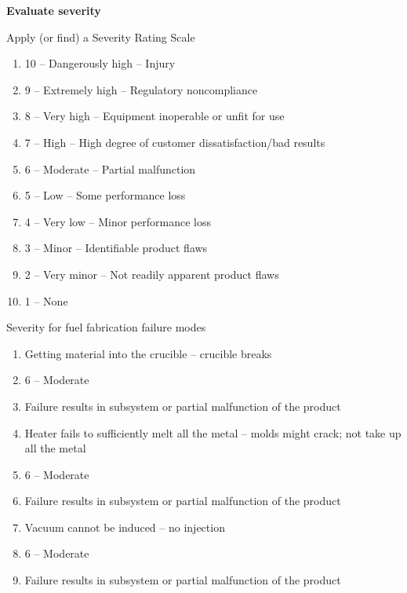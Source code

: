 \documentclass[aspectratio=1610,pdftex,dvipsnames,compress,xcolor={dvipsnames}]{beamer}
\begin{document}
\begin{frame}[plain]{}
    \centering\LARGE\textbf{Evaluate severity}
\end{frame}


\addtocounter{framenumber}{-1}
\begin{frame}{Apply (or find) a Severity Rating Scale}
    \begin{enumerate}[series=outerlist,topsep=0pt,itemsep=3pt,leftmargin=*,label=(\arabic*)]
        \item[]10 -- Dangerously high -- Injury
        \item[]9 -- Extremely high -- Regulatory noncompliance
        \item[]8 -- Very high -- Equipment inoperable or unfit for use
        \item[]7 -- High -- High degree of customer dissatisfaction/bad results 
        \item[]6 -- Moderate -- Partial malfunction
        \item[]5 -- Low -- Some performance loss
        \item[]4 -- Very low -- Minor performance loss
        \item[]3 -- Minor -- Identifiable product flaws
        \item[]2 -- Very minor -- Not readily apparent product flaws
        \item[]1 -- None 
    \end{enumerate}
\end{frame}


\begin{frame}{Severity for fuel fabrication failure modes}
    \begin{enumerate}[series=outerlist,topsep=0pt,itemsep=3pt,leftmargin=*,label=(\arabic*)]
        \item[]Getting material into the crucible -- crucible breaks
        \item[]6 -- Moderate
        \item[]Failure results in subsystem or partial malfunction of the product
            \vspace{0.10in}
        \item[]Heater fails to sufficiently melt all the metal -- molds might crack; not take up all the metal
        \item[]6 -- Moderate
        \item[]Failure results in subsystem or partial malfunction of the product
            \vspace{0.10in}
        \item[]Vacuum cannot be induced -- no injection
        \item[]6 -- Moderate
        \item[]Failure results in subsystem or partial malfunction of the product
    \end{enumerate}
\end{frame}
\end{document}
